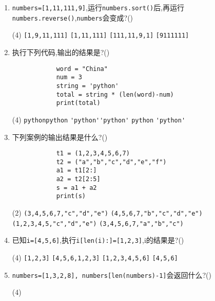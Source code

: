 \documentclass[11pt]{ctexart}
\begin{document}
    \begin{enumerate}
        \item \lstinline{numbers=[1,11,111,9]},运行\lstinline{numbers.sort()}后,再运行\lstinline{numbers.reverse()},\lstinline{numbers}会变成?(\qquad)
        \begin{tasks}(4)
            \task \lstinline{[1,9,11,111]}
            \task \lstinline{[1,11,111]}
            \task \lstinline{[111,11,9,1]}
            \task \lstinline{[9111111]}
        \end{tasks}

        \item 执行下列代码,输出的结果是?(\qquad)
        \begin{lstlisting}
            word = "China"
            num = 3
            string = 'python'
            total = string * (len(word)-num)
            print(total)
        \end{lstlisting}
        \begin{tasks}(4)
            \task \lstinline{pythonpython}
            \task \lstinline{'python''python'}
            \task \lstinline{python}
            \task \lstinline{'python'}
        \end{tasks}

        \item 下列案例的输出结果是什么?(\qquad)
        \begin{lstlisting}
            t1 = (1,2,3,4,5,6,7)
            t2 = ("a","b","c","d","e","f")
            a1 = t1[2:]
            a2 = t2[2:5]
            s = a1 + a2
            print(s)
        \end{lstlisting}
        \begin{tasks}(2)
            \task \lstinline{(3,4,5,6,7,"c","d","e")}
            \task \lstinline{(4,5,6,7,"b","c","d","e")}
            \task \lstinline{(1,2,3,4,5,"c","d","e")}
            \task \lstinline{(3,4,5,6,7,"a","b","c")}
        \end{tasks}

        \item 已知\lstinline{i=[4,5,6]},执行\lstinline{i[len(i):]=[1,2,3]},i的结果是?(\qquad)
        \begin{tasks}(4)
            \task \lstinline{[1,2,3]}
            \task \lstinline{[4,5,6,1,2,3]}
            \task \lstinline{[1,2,3,4,5,6]}
            \task \lstinline{[4,5,6]}
        \end{tasks}

        \item \lstinline{numbers=[1,3,2,8], numbers[len(numbers)-1]}会返回什么?(\qquad)
        \begin{tasks}(4)
        \end{tasks}


\end{enumerate}
\end{document}
